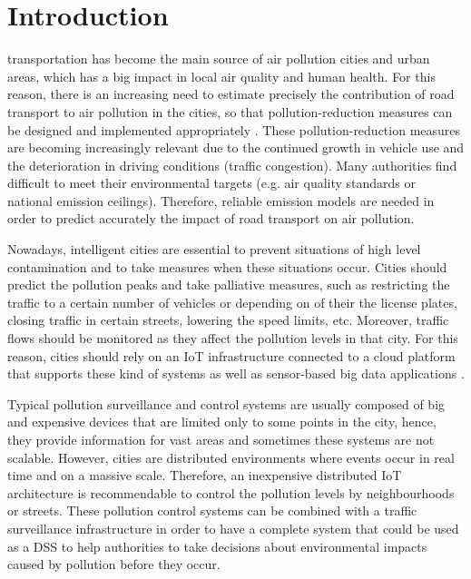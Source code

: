 
\chapter{Introduction}
 transportation has become the main source of air pollution cities and urban areas, which has a big impact in local air quality and human health. For this reason, there is an increasing need to estimate precisely the contribution of road transport to air pollution in the cities, so that pollution-reduction measures can be designed and implemented appropriately \cite{SNB10}. These pollution-reduction measures are becoming increasingly relevant due to the continued growth in vehicle use and the deterioration in driving conditions (traffic congestion). Many authorities find difficult to meet their environmental targets (e.g. air quality standards or national emission ceilings). Therefore, reliable emission models are needed in order to predict accurately the impact of road transport on air pollution.

Nowadays, intelligent cities are essential to prevent situations of high level contamination and to take measures when these situations occur. Cities should predict the pollution peaks and take palliative measures, such as restricting the traffic to a certain number of vehicles or depending on of their the license plates, closing traffic in certain streets, lowering the speed limits, etc. Moreover, traffic flows should be monitored as they affect the pollution levels in that city. For this reason, cities should rely on an \ac{IoT} infrastructure connected to a cloud platform that supports these kind of systems as well as sensor-based big data applications \cite{Bib18}.

Typical pollution surveillance and control systems are usually composed of big and expensive devices that are limited only to some points in the city, hence, they provide information for vast areas and sometimes these systems are not scalable. However, cities are distributed environments where events occur in real time and on a massive scale. Therefore, an inexpensive distributed \ac{IoT} architecture is recommendable to control the pollution levels by neighbourhoods or streets. These pollution control systems can be combined with a traffic surveillance infrastructure in order to have a complete system that could be used as a \ac{DSS} to help authorities to take decisions about environmental impacts caused by pollution before they occur.

